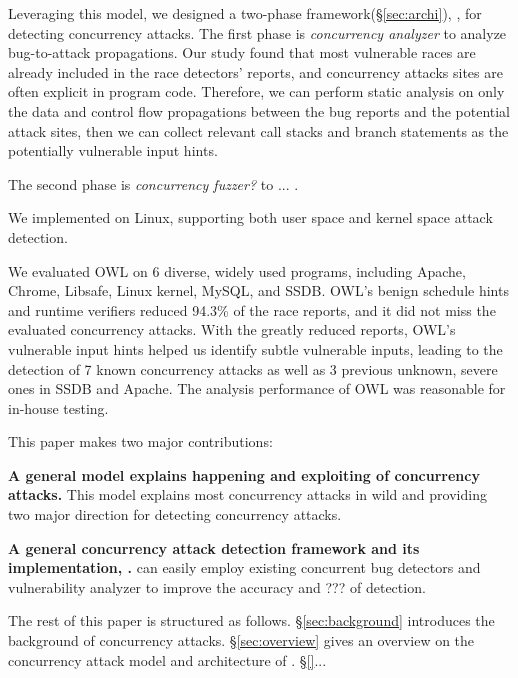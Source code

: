 Leveraging this model, we designed a two-phase framework(\S\ref{sec:archi}), \xxx, for detecting concurrency attacks. 
The first phase is \emph{concurrency analyzer} to analyze bug-to-attack propagations. 
Our study found that most vulnerable races are already included in the race detectors’ reports, 
and concurrency attacks sites are often explicit in program code.
Therefore, we can perform static analysis
on only the data and control flow propagations between the
bug reports and the potential attack sites, then we can collect
relevant call stacks and branch statements as the potentially
vulnerable input hints.

The second phase is \emph{concurrency fuzzer?} to ... .

We implemented \xxx on Linux, supporting both user space and kernel space attack detection. 



We evaluated OWL on 6 diverse, widely used programs, including Apache, Chrome, Libsafe, Linux kernel, MySQL,
and SSDB. OWL’s benign schedule hints and runtime verifiers reduced 94.3\% of the race reports, 
and it did not miss the evaluated concurrency attacks. With the greatly reduced reports,
OWL’s vulnerable input hints helped us identify subtle
vulnerable inputs, leading to the detection of 7 known concurrency
attacks as well as 3 previous unknown, severe ones
in SSDB and Apache. The analysis performance of OWL was
reasonable for in-house testing.


This paper makes two major contributions:

\begin{tightenum}
\item \textbf{A general model explains happening and exploiting of concurrency attacks.} 
This model explains most concurrency attacks in wild and 
providing two major direction for detecting concurrency attacks. 
	
\item \textbf{A general concurrency attack detection framework and its implementation, \xxx.} 
\xxx can easily employ existing concurrent bug detectors and vulnerability analyzer 
to improve the accuracy and ??? of detection.
	
\end{tightenum}

 

The rest of this paper is structured as follows. 
\S\ref{sec:background} introduces the background of concurrency attacks.
\S\ref{sec:overview} gives an overview on the concurrency attack model and architecture of \xxx.
\S\ref{}...





